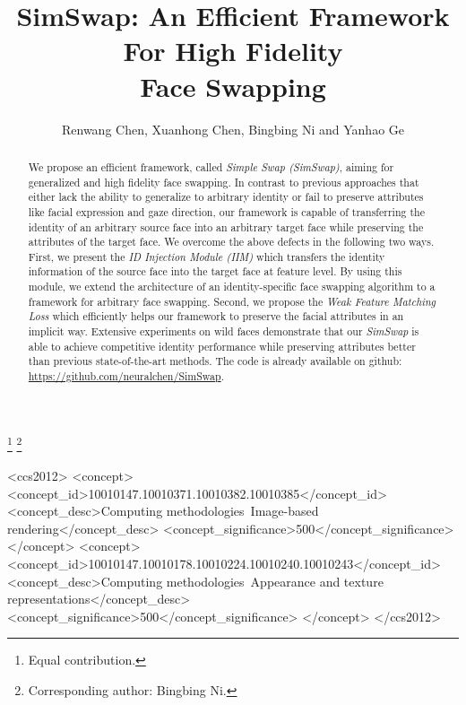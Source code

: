 \documentclass[sigconf]{acmart}
\begin{document}
\fancyhead{}







\title{SimSwap: An Efficient Framework For High Fidelity\\Face Swapping}

\begin{comment}
\author{Anonymous}
\email{Paper ID 1329}
\end{comment}

\author{Renwang Chen, Xuanhong Chen, Bingbing Ni and Yanhao Ge}
\thanks{Equal contribution.}
\thanks{Corresponding author: Bingbing Ni.}

\renewcommand{\thefootnote}{\fnsymbol{footnote}}
\renewcommand{\shortauthors}{Chen and Chen, et al.}

\begin{abstract}
We propose an efficient framework, called \emph{Simple Swap (SimSwap)}, aiming for generalized and high fidelity face swapping. In contrast to previous approaches that either lack the ability to generalize to arbitrary identity or fail to preserve attributes like facial expression and gaze direction, our framework is capable of transferring the identity of an arbitrary source face into an arbitrary target face while preserving the attributes of the target face. We overcome the above defects in the following two ways. First, we present the \emph{ID Injection Module (IIM)} which transfers the identity information of the source face into the target face at feature level. By using this module, we extend the architecture of an identity-specific face swapping algorithm to a framework for arbitrary face swapping. Second, we propose the \emph{Weak Feature Matching Loss} which efficiently helps our framework to preserve the facial attributes in an implicit way. Extensive experiments on wild faces demonstrate that our \emph{SimSwap} is able to achieve competitive identity performance while preserving attributes better than previous state-of-the-art methods.
The code is already available on github: \url{https://github.com/neuralchen/SimSwap}.
\end{abstract}

\begin{CCSXML}
<ccs2012>
   <concept>
       <concept_id>10010147.10010371.10010382.10010385</concept_id>
       <concept_desc>Computing methodologies~Image-based rendering</concept_desc>
       <concept_significance>500</concept_significance>
       </concept>
   <concept>
       <concept_id>10010147.10010178.10010224.10010240.10010243</concept_id>
       <concept_desc>Computing methodologies~Appearance and texture representations</concept_desc>
       <concept_significance>500</concept_significance>
       </concept>
 </ccs2012>
\end{CCSXML}
\end{document}
